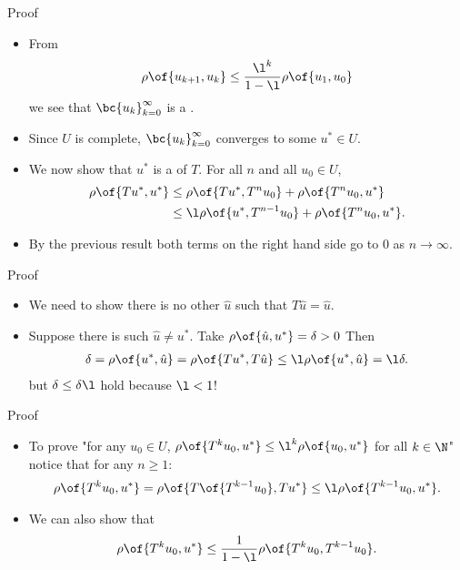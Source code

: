 \documentclass[11pt,xcolor={dvipsnames},aspectratio=159,hyperref={pdftex,pdfpagemode=UseNone,hidelinks,pdfdisplaydoctitle=true},usepdftitle=false]{beamer}
\begin{document}
\begin{frame}{Proof}
    \begin{itemize}
        \item From \begin{align*}
            \rho\of{u_{k+1},u_k}\leq \frac{\l^k}{1-\l} \rho\of{u_1,u_0}
        \end{align*}
        we see that $\bc{u_k}^\infty_{k=0}$ is a .
        \item Since $U$ is complete, $\bc{u_k}^\infty_{k=0}$ converges to some $u^* \in U$. 
        \item  We now show that $u^* $ is a  of $T$. For all $n$ and all $u_0 \in U$, \begin{align*}
            \rho\of{Tu^* ,u^* } &\leq \rho\of{Tu^* ,T^n u_0} + \rho\of{T^n u_0,u^* } \\
            & \leq \l \rho\of{u^* ,T^{n-1}u_0} + \rho\of{T^n u_0, u^* }.
        \end{align*}
        \item By the previous result both terms on the right hand side go to 0 as $n \to \infty$.           
    \end{itemize}

\end{frame}
\begin{frame}{Proof}
    \begin{itemize}
        \item We need to show there is no other $\hat{u}$ such that $T\hat{u} = \hat{u}$.
        \item Suppose there is such $\hat{u}\neq u^*$. Take $\rho\of{\hat{u},u^*}=\delta>0$ Then \begin{align*}
            \delta = \rho\of{u^* ,\hat{u}} = \rho\of{Tu^* ,T\hat{u}} \leq \l \rho\of{u^* ,\hat{u}} = \l \delta.
        \end{align*}
        but $\delta\leq\delta\l$  hold because $\l<1$!
    \end{itemize}
    \end{frame}


\begin{frame}{Proof}
    \begin{itemize}
        \item To prove "for any $u_0 \in U$, $\rho\of{T^k u_0,u^*} \leq \l^k \rho\of{u_0,u^*}$ for all $k\in\N$" notice that for any $n\geq1$:
        \begin{align*}
            \rho\of{T^k u_0,u^*} = \rho\of{T\of{T^{k-1} u_0}, Tu^*} \leq \l \rho\of{T^{k-1} u_0,u^*}.
        \end{align*}
        \item We can also show that \begin{align*}
            \rho\of{T^k u_0,u^*} \leq \frac{1}{1-\l} \rho\of{T^k u_0,T^{k-1} u_0}.
        \end{align*}
    \end{itemize}
    \end{frame}
\end{document}
